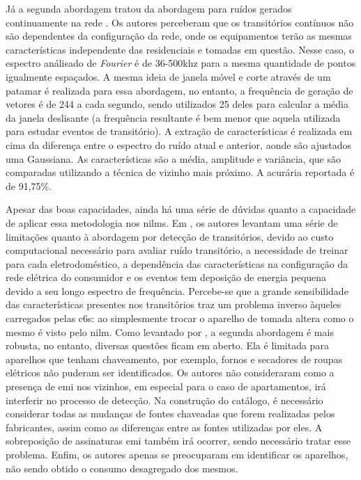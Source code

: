 \begin{enumerate}[label=\textbf{2.\arabic*},wide=\parindent]
\begin{itemize}[wide=\parindent]
Já a segunda abordagem tratou da abordagem para ruídos gerados
continuamente na rede \cite{nilm_gupta_patel_2010_30}. Os autores
perceberam que os transitórios contínuos não são dependentes da
configuração da rede, onde os equipamentos terão as mesmas
características independente das residenciais e tomadas em questão.
Nesse caso, o espectro análisado de \emph{Fourier} é de
36-500k\acs{hz} para a mesma quantidade de pontos igualmente
espaçados. A mesma ideia de janela móvel e corte através de um patamar
é realizada para essa abordagem, no entanto, a frequência de geração
de vetores é de 244 a cada segundo, sendo utilizados 25 deles para
calcular a média da janela deslisante (a frequência resultante é bem
menor que aquela utilizada para estudar eventos de transitório). 
A extração de características é realizada em cima da diferença entre o
espectro do ruído atual e anterior, aonde são ajustados uma Gaussiana.
As características são a média, amplitude e variância, que são
comparadas utilizando a técnica de vizinho mais próximo. A acurária
reportada é de 91,75\%.

Apesar das boas capacidades, ainda há uma série de dúvidas quanto a
capacidade de aplicar essa metodologia nos \glspl{nilm}. Em
\cite{nilm_gupta_patel_2010_30}, os autores levantam uma série de
limitações quanto à abordagem por detecção de transitórios, devido ao
custo computacional necessário para avaliar ruído transitório, a
necessidade de treinar para cada eletrodoméstico, a dependência das
características na configuração da rede elétrica do consumidor e os
eventos tem deposição de energia pequena devido a seu longo espectro
de frequência. Percebe-se que a grande sensibilidade das
características presentes nos transitórios traz um problema inverso
àqueles carregados pelas \glspl{c6}: ao simplesmente trocar
o aparelho de tomada altera como o mesmo é visto pelo \gls{nilm}.
Como levantado por \cite{nilm_zeifman_review_2011}, a segunda
abordagem é mais robusta, no entanto, diversas questões ficam em
aberto. Ela é limitada para aparelhos que tenham chaveamento, por
exemplo, fornos e secadores de roupas elétricos não puderam ser
identificados. Os autores não consideraram como a presença de
\gls{emi} nos vizinhos, em especial para o caso de apartamentos, irá
interferir no processo de detecção. Na construção do catálogo, é
necessário considerar todas as mudanças de fontes chaveadas que forem
realizadas pelos fabricantes, assim como as diferenças entre as fontes
utilizadas por eles. A sobreposição de assinaturas \gls{emi} também
irá ocorrer, sendo necessário tratar esse problema. Enfim, os
autores apenas se preocuparam em identificar os aparelhos, não sendo
obtido o consumo desagregado dos mesmos.


\end{itemize}
\end{enumerate}
